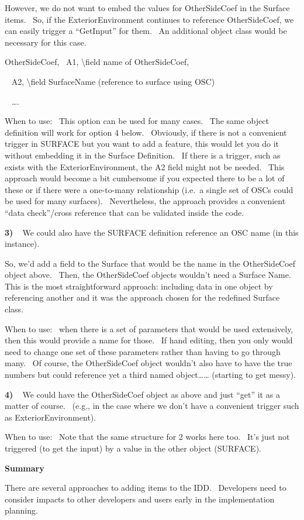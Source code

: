 However, we do not want to embed the values for OtherSideCoef in the Surface items.~ So, if the ExteriorEnvironment continues to reference OtherSideCoef, we can easily trigger a ``GetInput'' for them.~ An additional object class would be necessary for this case.

OtherSideCoef,~ A1, \textbackslash{}field name of OtherSideCoef,

~ A2, \textbackslash{}field SurfaceName (reference to surface using OSC)

~ \ldots{}.

When to use:~ This option can be used for many cases.~ The same object definition will work for option 4 below.~ Obviously, if there is not a convenient trigger in SURFACE but you want to add a feature, this would let you do it without embedding it in the Surface Definition.~ If there is a trigger, such as exists with the ExteriorEnvironment, the A2 field might not be needed.~ This approach would become a bit cumbersome if you expected there to be a lot of these or if there were a one-to-many relationship (i.e.~a single set of OSCs could be used for many surfaces).~ Nevertheless, the approach provides a convenient ``data check''/cross reference that can be validated inside the code.

\textbf{3)~~}We could also have the SURFACE definition reference an OSC name (in this instance).

So, we'd add a field to the Surface that would be the name in the OtherSideCoef object above.~ Then, the OtherSideCoef objects wouldn't need a Surface Name. This is the most straightforward approach: including data in one object by referencing another and it was the approach chosen for the redefined Surface class.

When to use:~ when there is a set of parameters that would be used extensively, then this would provide a name for those.~ If hand editing, then you only would need to change one set of these parameters rather than having to go through many.~ Of course, the OtherSideCoef object wouldn't also have to have the true numbers but could reference yet a third named object\ldots{}\ldots{} (starting to get messy).

\textbf{4)~~}We could have the OtherSideCoef object as above and just ``get'' it as a matter of course.~ (e.g., in the case where we don't have a convenient trigger such as ExteriorEnvironment).

When to use:~ Note that the same structure for 2 works here too.~ It's just not triggered (to get the input) by a value in the other object (SURFACE).

\textbf{Summary}

There are several approaches to adding items to the IDD.~ Developers need to consider impacts to other developers and users early in the implementation planning.
